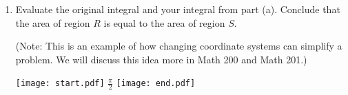 \documentclass[12pt]{article}
\begin{document}
\begin{enumerate}
\begin{enumerate}
\item Evaluate the original integral and your integral from part (a).  Conclude that the area of region $R$ is equal to the area of region $S$.

(Note: This is an example of how changing coordinate systems can simplify a problem.  We will discuss this idea more in Math 200 and Math 201.)

\texttt{[image: start.pdf]}
{{$\frac{\pi}{2}$}}
\texttt{[image: end.pdf]}


\end{enumerate}

\end{enumerate}
\end{document}
